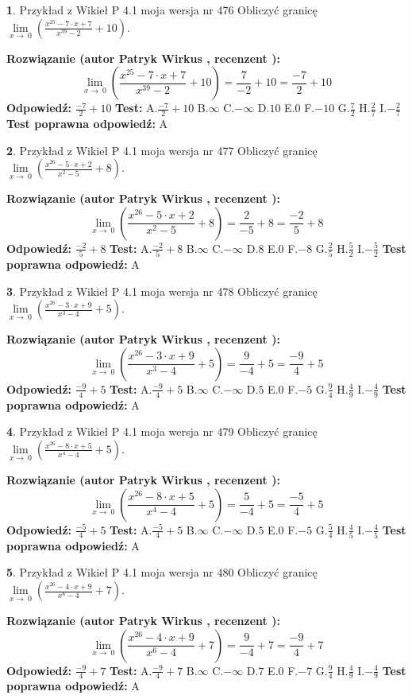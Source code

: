 \documentclass[12pt, a4paper]{article}
\theoremstyle{definition} %
\newtheorem{zad}{}
\newcommand{\zadStart}[1]{\begin{zad}#1\newline}
\newcommand{\zadStop}{\end{zad}}
\newcommand{\rozwStart}[2]{\noindent \textbf{Rozwiązanie (autor #1 , recenzent #2): }\newline}
\newcommand{\rozwStop}{\newline}
\newcommand{\odpStart}{\noindent \textbf{Odpowiedź:}\newline}
\newcommand{\odpStop}{\newline}
\newcommand{\testStart}{\noindent \textbf{Test:}\newline}
\newcommand{\testStop}{\newline}
\newcommand{\kluczStart}{\noindent \textbf{Test poprawna odpowiedź:}\newline}
\newcommand{\kluczStop}{\newline}
\begin{document}
\zadStart{Przykład z Wikieł P 4.1 moja wersja nr 476}
Obliczyć granicę $\lim\limits_{x\to\ 0}(\frac{x^{25}-7 \cdot x +7}{x^{39}-2}+10)$.
\zadStop
\rozwStart{Patryk Wirkus}{}
$$\lim\limits_{x\to\ 0}(\frac{x^{25}-7 \cdot x +7}{x^{39}-2}+10)=\frac{7}{-2}+10=\frac{-7}{2}+10$$
\rozwStop
\odpStart
$\frac{-7}{2}+10$
\odpStop
\testStart
A.$\frac{-7}{2}+10$
B.$\infty$
C.$-\infty$
D.$10$
E.$0$
F.$-10$
G.$\frac{7}{2}$
H.$\frac{2}{7}$
I.$-\frac{2}{7}$
\testStop
\kluczStart
A
\kluczStop



\zadStart{Przykład z Wikieł P 4.1 moja wersja nr 477}
Obliczyć granicę $\lim\limits_{x\to\ 0}(\frac{x^{26}-5 \cdot x +2}{x^{2}-5}+8)$.
\zadStop
\rozwStart{Patryk Wirkus}{}
$$\lim\limits_{x\to\ 0}(\frac{x^{26}-5 \cdot x +2}{x^{2}-5}+8)=\frac{2}{-5}+8=\frac{-2}{5}+8$$
\rozwStop
\odpStart
$\frac{-2}{5}+8$
\odpStop
\testStart
A.$\frac{-2}{5}+8$
B.$\infty$
C.$-\infty$
D.$8$
E.$0$
F.$-8$
G.$\frac{2}{5}$
H.$\frac{5}{2}$
I.$-\frac{5}{2}$
\testStop
\kluczStart
A
\kluczStop



\zadStart{Przykład z Wikieł P 4.1 moja wersja nr 478}
Obliczyć granicę $\lim\limits_{x\to\ 0}(\frac{x^{26}-3 \cdot x +9}{x^{3}-4}+5)$.
\zadStop
\rozwStart{Patryk Wirkus}{}
$$\lim\limits_{x\to\ 0}(\frac{x^{26}-3 \cdot x +9}{x^{3}-4}+5)=\frac{9}{-4}+5=\frac{-9}{4}+5$$
\rozwStop
\odpStart
$\frac{-9}{4}+5$
\odpStop
\testStart
A.$\frac{-9}{4}+5$
B.$\infty$
C.$-\infty$
D.$5$
E.$0$
F.$-5$
G.$\frac{9}{4}$
H.$\frac{4}{9}$
I.$-\frac{4}{9}$
\testStop
\kluczStart
A
\kluczStop



\zadStart{Przykład z Wikieł P 4.1 moja wersja nr 479}
Obliczyć granicę $\lim\limits_{x\to\ 0}(\frac{x^{26}-8 \cdot x +5}{x^{4}-4}+5)$.
\zadStop
\rozwStart{Patryk Wirkus}{}
$$\lim\limits_{x\to\ 0}(\frac{x^{26}-8 \cdot x +5}{x^{4}-4}+5)=\frac{5}{-4}+5=\frac{-5}{4}+5$$
\rozwStop
\odpStart
$\frac{-5}{4}+5$
\odpStop
\testStart
A.$\frac{-5}{4}+5$
B.$\infty$
C.$-\infty$
D.$5$
E.$0$
F.$-5$
G.$\frac{5}{4}$
H.$\frac{4}{5}$
I.$-\frac{4}{5}$
\testStop
\kluczStart
A
\kluczStop



\zadStart{Przykład z Wikieł P 4.1 moja wersja nr 480}
Obliczyć granicę $\lim\limits_{x\to\ 0}(\frac{x^{26}-4 \cdot x +9}{x^{6}-4}+7)$.
\zadStop
\rozwStart{Patryk Wirkus}{}
$$\lim\limits_{x\to\ 0}(\frac{x^{26}-4 \cdot x +9}{x^{6}-4}+7)=\frac{9}{-4}+7=\frac{-9}{4}+7$$
\rozwStop
\odpStart
$\frac{-9}{4}+7$
\odpStop
\testStart
A.$\frac{-9}{4}+7$
B.$\infty$
C.$-\infty$
D.$7$
E.$0$
F.$-7$
G.$\frac{9}{4}$
H.$\frac{4}{9}$
I.$-\frac{4}{9}$
\testStop
\kluczStart
A
\kluczStop
\end{document}

